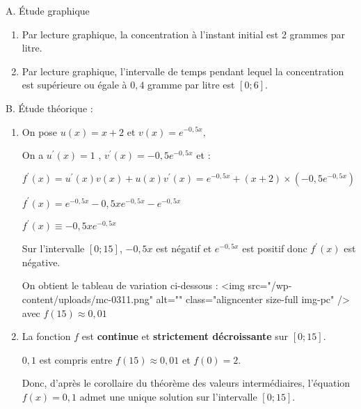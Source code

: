 \begin{corrige}
     \begin{h3}A. Étude graphique\end{h3}
     \begin{enumerate}
          \item
          Par lecture graphique, la concentration à l'instant initial est 2 grammes par litre.
          \item
          Par lecture graphique, l'intervalle de temps pendant lequel la concentration est supérieure ou égale à $0,4$ gramme par litre est $\left[0;6\right]$.
     \end{enumerate}
     \begin{h3}B. Étude théorique :\end{h3}
     \begin{enumerate}
          \item
          On pose $u\left(x\right)=x+2$ et $v\left(x\right)=e^{- 0,5x},$
          \par
          On a $u^{\prime}\left(x\right)=1$ , $v^{\prime}\left(x\right)=-0,5e^{- 0,5x}$ et :
          \par
          $f^{\prime}\left(x\right)=u^{\prime}\left(x\right)v\left(x\right)+u\left(x\right)v^{\prime}\left(x\right)=e^{- 0,5x}+\left(x+2\right)\times \left(-0,5e^{- 0,5x}\right)$
          \par
          $f^{\prime}\left(x\right)=e^{- 0,5x}-0,5xe^{- 0,5x}-e^{- 0,5x}$
          \par
          $f^{\prime}\left(x\right)\equiv -0,5xe^{- 0,5x}$
          \par
          Sur l'intervalle $\left[0 ; 15\right]$, $-0,5x$ est négatif et  $e^{- 0,5x}$ est positif donc $f^{\prime}\left(x\right)$ est négative.
          \par
          On obtient le tableau de variation ci-dessous :
          <img src="/wp-content/uploads/mc-0311.png" alt="" class="aligncenter size-full  img-pc" />
          avec $f\left(15\right)\approx 0,01$
          \item
          La fonction $f$ est \textbf{continue} et \textbf{strictement décroissante} sur $\left[0; 15\right]$.
          \par
          $0,1$ est compris entre $f\left(15\right)\approx 0,01$ et $f\left(0\right)=2$.
          \par
          Donc, d'après le corollaire du théorème des valeurs intermédiaires, l'équation $f\left(x\right)=0,1$ admet une unique solution sur l'intervalle $\left[0; 15\right]$.

\end{enumerate}
\end{corrige}

